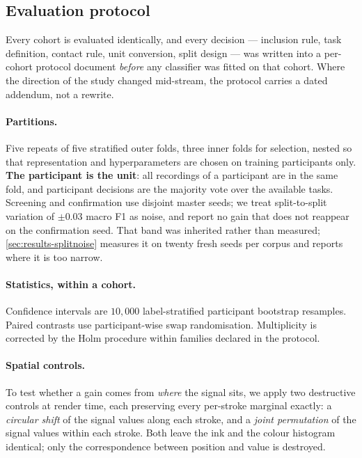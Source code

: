 \subsection{Evaluation protocol}
\label{sec:protocol}


Every cohort is evaluated identically, and every decision --- inclusion rule, task definition,
contact rule, unit conversion, split design --- was written into a per-cohort protocol document
\emph{before} any classifier was fitted on that cohort. Where the direction of the study changed
mid-stream, the protocol carries a dated addendum, not a rewrite.

\paragraph{Partitions.} Five repeats of five stratified outer folds, three inner folds for
selection, nested so that representation and hyperparameters are chosen on training participants
only. \textbf{The participant is the unit}: all recordings of a participant are in the same fold,
and participant decisions are the majority vote over the available tasks. Screening and
confirmation use disjoint master seeds; we treat split-to-split variation of $\pm 0.03$ macro F1 as
noise, and report no gain that does not reappear on the confirmation seed. That band was inherited
rather than measured; \cref{sec:results-splitnoise} measures it on twenty fresh seeds per corpus
and reports where it is too narrow.

\paragraph{Statistics, within a cohort.} Confidence intervals are $10{,}000$ label-stratified
participant bootstrap resamples. Paired contrasts use participant-wise swap randomisation.
Multiplicity is corrected by the Holm procedure \citep{holm1979} within families declared in the
protocol.

\paragraph{Spatial controls.} To test whether a gain comes from \emph{where} the signal sits, we
apply two destructive controls at render time, each preserving every per-stroke marginal exactly:
a \emph{circular shift} of the signal values along each stroke, and a \emph{joint permutation} of
the signal values within each stroke. Both leave the ink and the colour histogram identical; only
the correspondence between position and value is destroyed.

